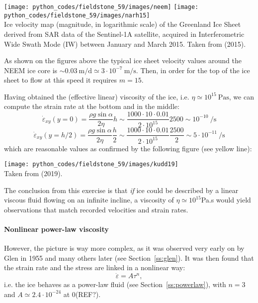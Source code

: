 \begin{center}
\texttt{[image: python\_codes/fieldstone\_59/images/neem]}
\texttt{[image: python\_codes/fieldstone\_59/images/narh15]}\\
{\captionfont Ice velocity map (magnitude, in logarithmic scale) of the Greenland Ice Sheet
derived from SAR data of the Sentinel-1A satellite, acquired in Interferometric Wide Swath
Mode (IW) between January and March 2015. Taken from \textcite{narh15} (2015).}
\end{center}

As shown on the figures above the typical ice sheet velocity values around the NEEM ice core 
is $\sim 0.03~\si{\meter\per\day} \simeq 3\cdot 10^{-7}~\si{\meter\per\second}$. 
Then, in order for the top of the ice sheet to flow at this speed it requires $m=15$.

Having obtained the (effective linear) viscosity of the ice, i.e. 
$\eta\simeq 10^{15}~\si{\pascal\second}$,
we can compute the strain rate at the bottom and in the middle:
\[
\dot{\varepsilon}_{xy}(y=0) 
= \frac{\rho g \sin \alpha}{2 \eta} h
\sim \frac{1000\cdot 10 \cdot 0.01}{2 \cdot 10^{15}}2500
\sim 10^{-10}~\si{\per\second}
\]
\[
\dot{\varepsilon}_{xy}(y=h/2) 
= \frac{\rho g \sin \alpha}{2 \eta} \frac{h}{2}
\sim \frac{1000\cdot 10 \cdot 0.01}{2 \cdot 10^{15}}\frac{2500}{2}
\sim 5\cdot 10^{-11}~\si{\per\second}
\]
which are reasonable values as confirmed by the following figure (see yellow line):  
\begin{center}
\texttt{[image: python\_codes/fieldstone\_59/images/kudd19]}\\
{\captionfont Taken from \textcite{kudd19} (2019).}
\end{center}

The conclusion from this exercise is that {\sl if} ice could be described by 
a linear viscous fluid flowing on an infinite incline, a viscosity of $\eta\simeq 10^{15}$Pa.s
would yield observations that match recorded velocities and strain rates. 


\paragraph{Nonlinear power-law viscosity}
However, the picture is way more complex, as it was observed very early on 
by Glen in 1955 \cite{glen55} and many others later (see Section~\ref{ss:glen}). 
It was then found that the strain rate and the stress are linked in a nonlinear way: 
\[
\dot{\varepsilon} = A \tau^n,
\]
i.e. the ice behaves as a power-law fluid (see Section~\ref{ss:powerlaw}), with 
$n=3$ and $A\simeq 2.4\cdot 10^{-24}$ at 0\degree (REF?).

